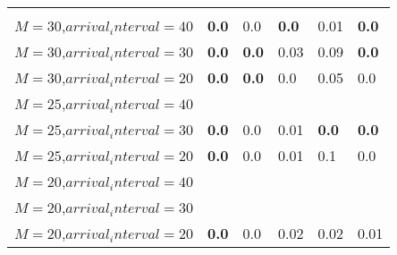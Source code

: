 \begin{tabular}{l  | l l l l l }
& \multicolumn{5}{c}{} \\
$M=30$,$arrival_interval=40$ & \textbf{0.0} & 0.0 & \textbf{0.0} & 0.01 & \textbf{0.0} \\
$M=30$,$arrival_interval=30$ & \textbf{0.0} & \textbf{0.0} & 0.03 & 0.09 & \textbf{0.0} \\
$M=30$,$arrival_interval=20$ & \textbf{0.0} & \textbf{0.0} & 0.0 & 0.05 & 0.0 \\
$M=25$,$arrival_interval=40$ &  &  &  &  &  \\
$M=25$,$arrival_interval=30$ & \textbf{0.0} & 0.0 & 0.01 & \textbf{0.0} & \textbf{0.0} \\
$M=25$,$arrival_interval=20$ & \textbf{0.0} & 0.0 & 0.01 & 0.1 & 0.0 \\
$M=20$,$arrival_interval=40$ &  &  &  &  &  \\
$M=20$,$arrival_interval=30$ &  &  &  &  &  \\
$M=20$,$arrival_interval=20$ & \textbf{0.0} & 0.0 & 0.02 & 0.02 & 0.01
\end{tabular}